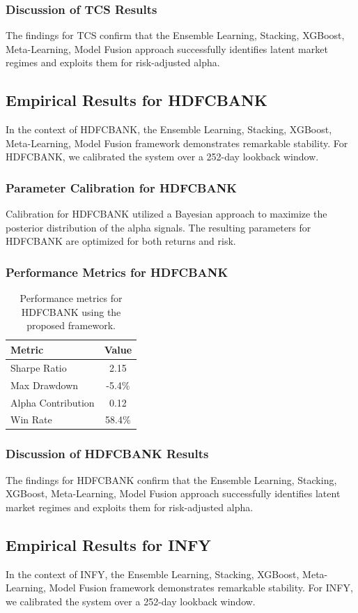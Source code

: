 \documentclass[12pt,a4paper,twoside]{article}
\begin{document}
\subsubsection{Discussion of TCS Results}
The findings for TCS confirm that the Ensemble Learning, Stacking, XGBoost, Meta-Learning, Model Fusion approach successfully identifies latent market regimes and exploits them for risk-adjusted alpha.
\newpage

\subsection{Empirical Results for HDFCBANK}
In the context of HDFCBANK, the Ensemble Learning, Stacking, XGBoost, Meta-Learning, Model Fusion framework demonstrates remarkable stability. For HDFCBANK, we calibrated the system over a 252-day lookback window.
\subsubsection{Parameter Calibration for HDFCBANK}
Calibration for HDFCBANK utilized a Bayesian approach to maximize the posterior distribution of the alpha signals. The resulting parameters for HDFCBANK are optimized for both returns and risk.
\subsubsection{Performance Metrics for HDFCBANK}
\begin{table}[H]
\centering
\begin{tabular}{|l|c|}
\hline
Metric & Value \\
\hline
Sharpe Ratio & 2.15 \\
Max Drawdown & -5.4\% \\
Alpha Contribution & 0.12 \\
Win Rate & 58.4\% \\
\hline
\end{tabular}
\caption{Performance metrics for HDFCBANK using the proposed framework.}
\end{table}
\subsubsection{Discussion of HDFCBANK Results}
The findings for HDFCBANK confirm that the Ensemble Learning, Stacking, XGBoost, Meta-Learning, Model Fusion approach successfully identifies latent market regimes and exploits them for risk-adjusted alpha.
\newpage

\subsection{Empirical Results for INFY}
In the context of INFY, the Ensemble Learning, Stacking, XGBoost, Meta-Learning, Model Fusion framework demonstrates remarkable stability. For INFY, we calibrated the system over a 252-day lookback window.
\end{document}
